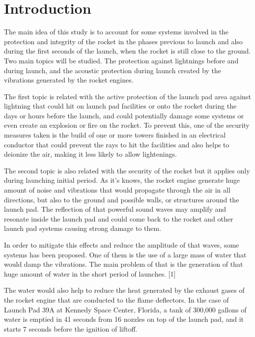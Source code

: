 \section{Introduction}
The main idea of this study is to account for some systems involved in the
protection and integrity of the rocket in the phases previous to launch and
also during the first seconds of the launch, when the rocket is still close
to the ground. Two main topics will be studied. The protection against lightnings
before and during launch, and the acoustic protection during launch created by the
vibrations generated by the rocket engines.

The first topic is related with the active protection of the launch pad area against
lightning that could hit on launch pad facilities or onto the rocket during the days
or hours before the launch, and could potentially damage some systems or even create
an explosion or fire on the rocket. To prevent this, one of the security measures
taken is the build of one or more towers finished in an electrical conductor that
could prevent the rays to hit the facilities and also helps to deionize the air,
making it less likely to allow lightenings.

The second topic is also related with the security of the rocket but it applies
only during launching initial period. As it’s knows, the rocket engine generate
huge amount of noise and vibrations that would propagate through the air in all
directions, but also to the ground and possible walls, or structures around the
launch pad. The reflection of that powerful sound waves may amplify and resonate
inside the launch pad and could come back to the rocket and other launch pad
systems causing strong damage to them.

In order to mitigate this effects and reduce the amplitude of that waves, some
systems has been proposed. One of them is the use of a large mass of water that
would damp the vibrations. The main problem of that is the generation of that
huge amount of water in the short period of launches. [1]

The water would also help to reduce the heat generated by the exhaust gases of
the rocket engine that are conducted to the flame deflectors. In the case of
Launch Pad 39A at Kennedy Space Center, Florida, a tank of 300,000 gallons of
water is emptied in 41 seconds from 16 nozzles on top of the launch pad, and
it starts 7 seconds before the ignition of liftoff.

